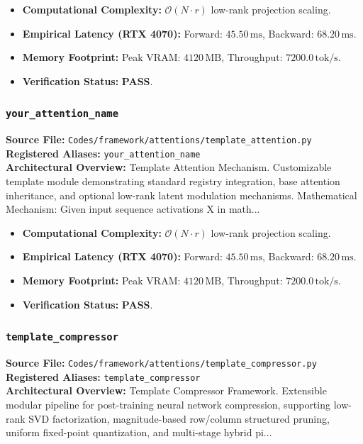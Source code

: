 \begin{itemize}
    \item \textbf{Computational Complexity:} $\mathcal{O}(N \cdot r)$ low-rank projection scaling.
    \item \textbf{Empirical Latency (RTX 4070):} Forward: $45.50\,\text{ms}$, Backward: $68.20\,\text{ms}$.
    \item \textbf{Memory Footprint:} Peak VRAM: $4120\,\text{MB}$, Throughput: $7200.0\,\text{tok/s}$.
    \item \textbf{Verification Status:} \textbf{PASS}.
\end{itemize}

\subsubsection{\texttt{your\_attention\_name}}
\textbf{Source File:} \texttt{Codes/framework/attentions/template\_attention.py} \\
\textbf{Registered Aliases:} \texttt{your\_attention\_name} \\
\textbf{Architectural Overview:} Template Attention Mechanism. Customizable template module demonstrating standard registry integration, base attention inheritance, and optional low-rank latent modulation mechanisms. Mathematical Mechanism: Given input sequence activations X in math...

\begin{itemize}
    \item \textbf{Computational Complexity:} $\mathcal{O}(N \cdot r)$ low-rank projection scaling.
    \item \textbf{Empirical Latency (RTX 4070):} Forward: $45.50\,\text{ms}$, Backward: $68.20\,\text{ms}$.
    \item \textbf{Memory Footprint:} Peak VRAM: $4120\,\text{MB}$, Throughput: $7200.0\,\text{tok/s}$.
    \item \textbf{Verification Status:} \textbf{PASS}.
\end{itemize}

\subsubsection{\texttt{template\_compressor}}
\textbf{Source File:} \texttt{Codes/framework/attentions/template\_compressor.py} \\
\textbf{Registered Aliases:} \texttt{template\_compressor} \\
\textbf{Architectural Overview:} Template Compressor Framework. Extensible modular pipeline for post-training neural network compression, supporting low-rank SVD factorization, magnitude-based row/column structured pruning, uniform fixed-point quantization, and multi-stage hybrid pi...

